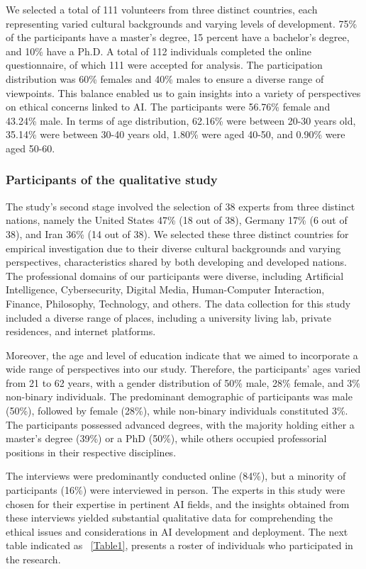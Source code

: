 \documentclass[sigconf]{acmart}
\begin{document}
We selected a total of 111 volunteers from three distinct countries, each representing varied cultural backgrounds and varying levels of development. 75\% of the participants have a master's degree, 15 percent have a bachelor's degree, and 10\% have a Ph.D. A total of 112 individuals completed the online questionnaire, of which 111 were accepted for analysis. The participation distribution was 60\% females and 40\% males to ensure a diverse range of viewpoints. This balance enabled us to gain insights into a variety of perspectives on ethical concerns linked to AI. The participants were 56.76\% female and 43.24\% male. In terms of age distribution, 62.16\% were between 20-30 years old, 35.14\% were between 30-40 years old, 1.80\% were aged 40-50, and 0.90\% were aged 50-60.

\subsubsection{Participants of the qualitative study}

The study's second stage involved the selection of 38 experts from three distinct nations, namely the United States 47\% (18 out of 38), Germany 17\% (6 out of 38), and Iran 36\% (14 out of 38). We selected these three distinct countries for empirical investigation due to their diverse cultural backgrounds and varying perspectives, characteristics shared by both developing and developed nations. The professional domains of our participants were diverse, including Artificial Intelligence, Cybersecurity, Digital Media, Human-Computer Interaction, Finance, Philosophy, Technology, and others. The data collection for this study included a diverse range of places, including a university living lab, private residences, and internet platforms.

Moreover, the age and level of education indicate that we aimed to incorporate a wide range of perspectives into our study.  Therefore, the participants' ages varied from 21 to 62 years, with a gender distribution of 50\% male, 28\% female, and 3\% non-binary individuals. The predominant demographic of participants was male (50\%), followed by female (28\%), while non-binary individuals constituted 3\%. The participants possessed advanced degrees, with the majority holding either a master's degree (39\%) or a PhD (50\%), while others occupied professorial positions in their respective disciplines.

The interviews were predominantly conducted online (84\%), but a minority of participants (16\%) were interviewed in person. The experts in this study were chosen for their expertise in pertinent AI fields, and the insights obtained from these interviews yielded substantial qualitative data for comprehending the ethical issues and considerations in AI development and deployment. The next table indicated as ~\autoref{Table1}, presents a roster of individuals who participated in the research. 
\end{document}
